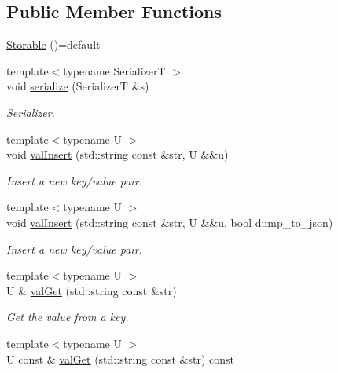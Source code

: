 \subsection*{Public Member Functions}
\begin{DoxyCompactItemize}
\item 
\hyperlink{structvt_1_1vrt_1_1collection_1_1storage_1_1_storable_aa6cb609d17c3fffd1416842cf9cc27e9}{Storable} ()=default
\item 
{\footnotesize template$<$typename SerializerT $>$ }\\void \hyperlink{structvt_1_1vrt_1_1collection_1_1storage_1_1_storable_a9fac390a50e3de2776afb730dd3c0418}{serialize} (SerializerT \&s)
\begin{DoxyCompactList}\small\item\em Serializer. \end{DoxyCompactList}\item 
{\footnotesize template$<$typename U $>$ }\\void \hyperlink{structvt_1_1vrt_1_1collection_1_1storage_1_1_storable_a8c0cbce1b3e261dd375d431a56a7c350}{val\+Insert} (std\+::string const \&str, U \&\&u)
\begin{DoxyCompactList}\small\item\em Insert a new key/value pair. \end{DoxyCompactList}\item 
{\footnotesize template$<$typename U $>$ }\\void \hyperlink{structvt_1_1vrt_1_1collection_1_1storage_1_1_storable_a7c4652c490f753648bedf483bcb3f75d}{val\+Insert} (std\+::string const \&str, U \&\&u, bool dump\+\_\+to\+\_\+json)
\begin{DoxyCompactList}\small\item\em Insert a new key/value pair. \end{DoxyCompactList}\item 
{\footnotesize template$<$typename U $>$ }\\U \& \hyperlink{structvt_1_1vrt_1_1collection_1_1storage_1_1_storable_a81a60463dff73c6375422344c8eb410c}{val\+Get} (std\+::string const \&str)
\begin{DoxyCompactList}\small\item\em Get the value from a key. \end{DoxyCompactList}\item 
{\footnotesize template$<$typename U $>$ }\\U const  \& \hyperlink{structvt_1_1vrt_1_1collection_1_1storage_1_1_storable_a5014622ff587047270462efeca4ca2dd}{val\+Get} (std\+::string const \&str) const

\end{DoxyCompactItemize}
